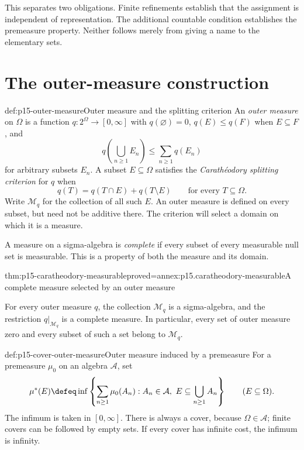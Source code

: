 This separates two obligations. Finite refinements establish that the
assignment is independent of representation. The additional countable
condition establishes the premeasure property. Neither follows merely
from giving a name to the elementary sets.

\section{The outer-measure construction}
\label{sec:p15-outer-measure}

\begin{hbdefinition}{def:p15-outer-measure}{Outer measure and the splitting criterion}
An \emph{outer measure} on \(\Omega\) is a function
\(q:2^\Omega\to[0,\infty]\) with \(q(\varnothing)=0\),
\(q(E)\leq q(F)\) when \(E\subseteq F\), and
\[
 q\left(\bigcup_{n\geq1}E_n\right)\leq\sum_{n\geq1}q(E_n)
\]
for arbitrary subsets \(E_n\). A subset \(E\subseteq\Omega\)
satisfies the \emph{Carath\'eodory splitting criterion} for \(q\) when
\[
 q(T)=q(T\cap E)+q(T\setminus E)
                 \qquad\text{for every }T\subseteq\Omega.
\]
Write \(\mathcal M_q\) for the collection of all such \(E\).
An outer measure is defined on every subset, but need not be additive
there. The criterion will select a domain on which it is a measure.

A measure on a sigma-algebra is \emph{complete} if every subset of
every measurable null set is measurable. This is a property of both
the measure and its domain.
\end{hbdefinition}

\begin{hbtheorem}{thm:p15-caratheodory-measurable}{proved=annex:p15.caratheodory-measurable}{A complete measure selected by an outer measure}
\par\nobreak
For every outer measure \(q\), the collection \(\mathcal M_q\) is
a sigma-algebra, and the restriction \(q|_{\mathcal M_q}\) is a
complete measure. In particular, every set of outer measure zero and
every subset of such a set belong to \(\mathcal M_q\).
\end{hbtheorem}

\begin{hbdefinition}{def:p15-cover-outer-measure}{Outer measure induced by a premeasure}
For a premeasure \(\mu_0\) on an algebra \(\mathcal A\), set
\[
 \mu^*(E)\defeq
 \inf\left\{\sum_{n\geq1}\mu_0(A_n):
       A_n\in\mathcal A,\ E\subseteq\bigcup_{n\geq1}A_n\right\}
       \qquad(E\subseteq\Omega).
\]
The infimum is taken in \([0,\infty]\). There is always a cover,
because \(\Omega\in\mathcal A\); finite covers can be followed
by empty sets. If every cover has infinite cost, the infimum is infinity.
\end{hbdefinition}

